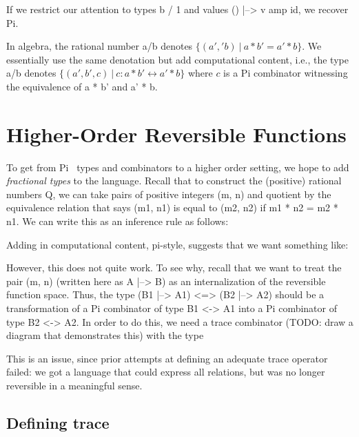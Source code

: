 \documentclass{sigplanconf}
\begin{document}
If we restrict our attention to types {{b / 1}} and values {{ () |--> v amp id}},
we recover {{Pi}}. 

In algebra, the rational number {{a/b}} denotes 
$\{ (a','b) ~|~ a * b' = a' * b \}$. We essentially use the same denotation but
add computational content, i.e., the type {{a/b}} denotes
$\{ (a',b',c) ~|~ c : a * b' \leftrightarrow a' * b \}$ where $c$ is a {{Pi}}
combinator witnessing the equivalence of {{a * b'}} and {{a' * b}}. 

\section{Higher-Order Reversible Functions}

To get from {{Pi}}~\cite{James:2012:IE:2103656.2103667} types and combinators
to a higher order setting, we hope to add \emph{fractional types} to the
language. Recall that to construct the (positive) rational numbers {{Q}}, we
can take pairs of positive integers {{(m, n)}} and quotient by the
equivalence relation that says {{(m1, n1)}} is equal to {{(m2, n2)}} if 
{{m1 * n2 = m2 * n1}}. We can write this as an inference rule as follows:


\noindent
Adding in computational content, pi-style, suggests that we want something like:


\noindent
However, this does not quite work. To see why, recall that we want to treat the
pair {{(m, n)}} (written here as {{A |--> B}}) as an internalization of the
reversible function space. Thus, the type {{(B1 |--> A1) <=> (B2 |--> A2)}}
should be a transformation of a {{Pi}} combinator of type {{B1 <-> A1}} into a
{{Pi}} combinator of type {{B2 <-> A2}}. In order to do this, we need a trace
combinator (TODO: draw a diagram that demonstrates this) with the type


\noindent
This is an issue, since prior attempts at defining an adequate trace operator
failed: we got a language that could express all relations, but was no longer
reversible in a meaningful sense.

\subsection{Defining trace}
\end{document}
